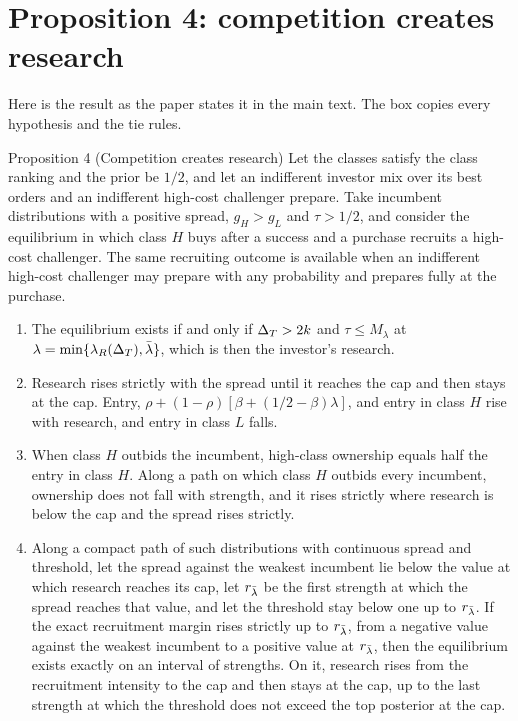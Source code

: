 \section{Proposition 4: competition creates research}\label{sec:research-prop4}

Here is the result as the paper states it in the main text. The box copies every hypothesis and the tie rules.

\begin{paperresult}{Proposition 4 (Competition creates research)}
Let the classes satisfy the class ranking and the prior be \(1/2\), and let an indifferent investor mix over its best
orders and an indifferent high-cost challenger prepare. Take incumbent distributions with a positive spread,
\(g_H>g_L\) and \(\tau>1/2\), and consider the equilibrium in which class \(H\) buys after a success and a purchase
recruits a high-cost challenger. The same recruiting outcome is available when an indifferent high-cost challenger
may prepare with any probability and prepares fully at the purchase.
\begin{enumerate}[label=(\alph*),leftmargin=2em]
\item The equilibrium exists if and only if \(\Delta_T>2k\) and \(\tau\le M_\lambda\) at \(\lambda=\min\{\lambda_R(\Delta_T),\bar\lambda\}\),
which is then the investor's research.
\item Research rises strictly with the spread until it reaches the cap and then stays at the cap. Entry,
\(\rho+(1-\rho)[\beta+(1/2-\beta)\lambda]\), and entry in class \(H\) rise with research, and entry in class \(L\) falls.
\item When class \(H\) outbids the incumbent, high-class ownership equals half the entry in class \(H\). Along a path on
which class \(H\) outbids every incumbent, ownership does not fall with strength, and it rises strictly where research
is below the cap and the spread rises strictly.
\item Along a compact path of such distributions with continuous spread and threshold, let the spread against the
weakest incumbent lie below the value at which research reaches its cap, let \(r_{\bar\lambda}\) be the first strength at
which the spread reaches that value, and let the threshold stay below one up to \(r_{\bar\lambda}\). If the exact recruitment
margin rises strictly up to \(r_{\bar\lambda}\), from a negative value against the weakest incumbent to a positive value at
\(r_{\bar\lambda}\), then the equilibrium exists exactly on an interval of strengths. On it, research rises from the
recruitment intensity to the cap and then stays at the cap, up to the last strength at which the threshold does not
exceed the top posterior at the cap.
\end{enumerate}
\end{paperresult}

